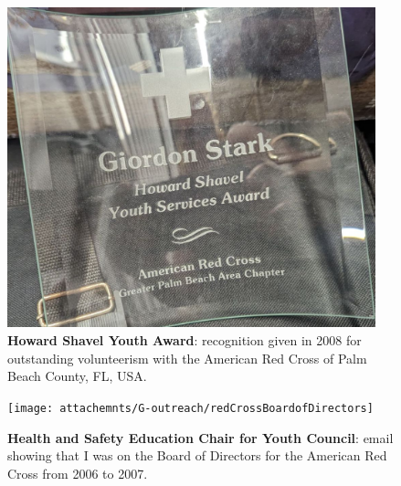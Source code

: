 \begin{figure}[h!]
	\centering
	\caption{\textbf{Howard Shavel Youth Award}: recognition given in 2008 for outstanding volunteerism with the American Red Cross of Palm Beach County, FL, USA.}
	\includegraphics[width=0.95\textwidth]{attachments/G-outreach/howardShavelYouthAward}
\end{figure}

\begin{figure}[h!]
	\centering
	\caption{\textbf{Health and Safety Education Chair for Youth Council}: email showing that I was on the Board of Directors for the American Red Cross from 2006 to 2007.}
	\texttt{[image: attachemnts/G-outreach/redCrossBoardofDirectors]}
\end{figure}



